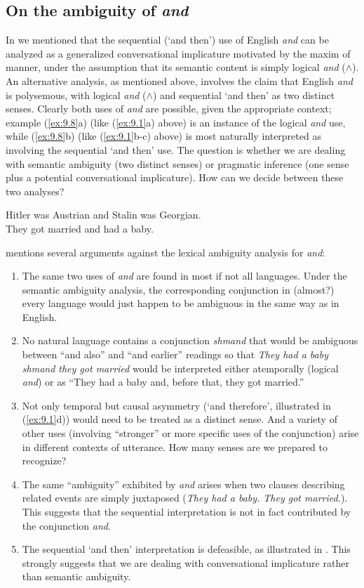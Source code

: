 \subsection{On the ambiguity of \textit{and}}\label{sec:9.2.1} 

In  we mentioned that the sequential (‘and then’) use of English \textit{and} can be analyzed as a generalized conversational implicature motivated by the maxim of manner, under the assumption that its semantic content is simply logical \textit{and} ($\wedge$). An alternative analysis, as mentioned above, involves the claim that English \textit{and} is polysemous, with logical \textit{and} ($\wedge$) and sequential ‘and then’ as two distinct senses. Clearly both uses of \textit{and} are possible, given the appropriate context; example (\ref{ex:9.8}a) (like (\ref{ex:9.1}a) above) is an instance of the logical \textit{and} use, while (\ref{ex:9.8}b) (like (\ref{ex:9.1}b-c) above) is most naturally interpreted as involving the sequential ‘and then’ use. The question is whether we are dealing with semantic ambiguity (two distinct senses) or pragmatic inference (one sense plus a potential conversational implicature). How can we decide between these two analyses?


\ea \label{ex:9.8}
\ea Hitler was Austrian and Stalin was {Georgian}.\\
\ex They got married and had a baby.
                       \z
\z


\citet{Horn2004} mentions several arguments against the lexical ambiguity analysis for \textit{and}:


\begin{enumerate}[label=\roman*.]
\item The same two uses of \textit{and} are found in most if not all languages. Under the semantic ambiguity analysis, the corresponding conjunction in (almost?) every language would just happen to be ambiguous in the same way as in English.
\item No natural language contains a conjunction \textit{shmand} that would be ambiguous between “and also” and “and earlier” readings so that \textit{They had a baby shmand they got married} would be interpreted either atemporally (logical \textit{and}) or as “They had a baby and, before that, they got married.”
\item Not only temporal but causal asymmetry (‘and therefore’, illustrated in (\ref{ex:9.1}d)) would need to be treated as a distinct sense. And a variety of other uses (involving “stronger” or more specific uses of the conjunction) arise in different contexts of utterance. How many senses are we prepared to recognize?
\item The same “ambiguity” exhibited by \textit{and} arises when two clauses describing related events are simply juxtaposed (\textit{They had a baby. They got married.}). This suggests that the sequential interpretation is not in fact contributed by the conjunction \textit{and}.
\item The sequential ‘and then’ interpretation is defeasible, as illustrated in . This strongly suggests that we are dealing with conversational implicature rather than semantic ambiguity.
\end{enumerate}

